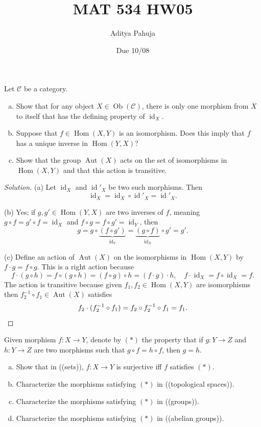 \documentclass[10pt]{article}
\title{MAT 534 HW05}
\author{\large Aditya Pahuja}
\date{\large Due 10/08}
\providecommand{\ii}{\item}
\providecommand{\inv}{^{-1}}
\newenvironment{soln}{\begin{proof}[Solution]}{\end{proof}}
\providecommand{\Hom}{\operatorname{Hom}}
\providecommand{\Aut}{\operatorname{Aut}}
\providecommand{\id}{\operatorname{id}}
\newcommand{\doubleparen}[1]{(\!(#1)\!)}
\begin{document}
\maketitle

\begin{problem}
    Let $\mathscr C$ be a category.
    \begin{enumerate}[(a)]
	\ii Show that for any object $X\in\operatorname{Ob}(\mathscr C)$,
	there is only one morphism from $X$ to itself
	that has the defining property of $\id_X$.
	\ii Suppose that $f\in\Hom(X,Y)$ is an isomorphism.
	Does this imply that $f$ has a unique inverse in $\Hom(Y,X)$?
	\ii Show that the group $\Aut(X)$
	acts on the set of isomorphisms in $\Hom(X,Y)$
	and that this action is transitive.
    \end{enumerate}
\end{problem}

\begin{soln}
    (a) Let $\id_X$ and $\id'_X$ be two such morphisms. Then
    \begin{equation*}
        \id_X = \id_X\circ\id'_X = \id'_X.
    \end{equation*}

    (b) Yes; if $g,g'\in\Hom(Y,X)$ are two inverses of $f$,
    meaning $g\circ f = g'\circ f = \id_X$ and $f\circ g = f\circ g' = \id_Y$,
    then
    \begin{equation*}
	g = g\circ \underbrace{(f\circ g')}_{\id_Y}
	= \underbrace{(g\circ f)}_{\id_X}\circ g' = g'.
    \end{equation*}

    (c) Define an action of $\Aut(X)$ on the isomorphisms in $\Hom(X,Y)$ by
    $f\cdot g = f\circ g$. This is a right action because
    \begin{equation*}
	f\cdot(g\circ h) = f\circ(g\circ h) = (f\circ g)\circ h
	= (f\cdot g)\cdot h,\quad
	f\cdot\id_X = f\circ\id_X = f.
    \end{equation*}
    The action is transitive because
    given $f_1,f_2\in\Hom(X,Y)$ are isomorphisms then
    $f_2\inv \circ f_1\in\Aut(X)$ satisfies
    \begin{equation*}
        f_2\cdot(f_2\inv\circ f_1) = f_2\circ f_2\inv\circ f_1 = f_1.\qedhere
    \end{equation*}
\end{soln}

\begin{problem}
    Given morphism $f\colon X\to Y$, denote by $(*)$ the property that
    if $g\colon Y\to Z$ and $h\colon Y\to Z$ are two morphisms
    such that $g\circ f = h\circ f$, then $g = h$.
    \begin{enumerate}[(a)]
	\ii Show that in \doubleparen{sets}, $f\colon X\to Y$ is surjective
	iff $f$ satisfies $(*)$.
	\ii Characterize the morphisms satisfying $(*)$ in
	\doubleparen{topological spaces}.
	\ii Characterize the morphisms satisfying $(*)$ in
	\doubleparen{groups}.
	\ii Characterize the morphisms satisfying $(*)$ in
	\doubleparen{abelian groups}.
    \end{enumerate}
\end{problem}
\end{document}
